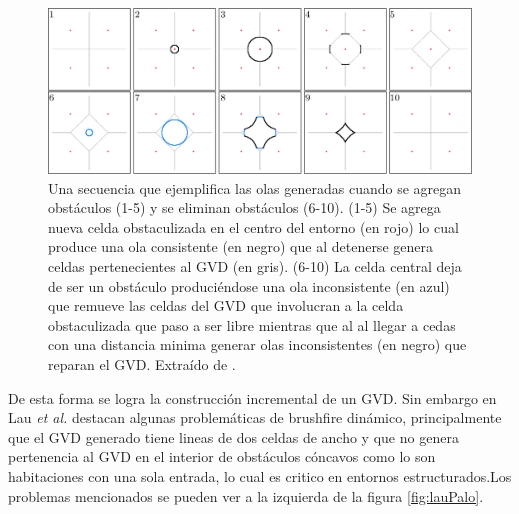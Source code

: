 \begin{figure}[H]
  \center
  \includegraphics[width=1\linewidth]{imagenes/wavesKalra.png}
  \caption{Una secuencia que ejemplifica las olas generadas cuando se agregan obstáculos (1-5) y se eliminan obstáculos (6-10). (1-5) Se agrega nueva celda obstaculizada en el centro del entorno (en rojo) lo cual produce una ola consistente (en negro) que al detenerse genera celdas pertenecientes al GVD (en gris). (6-10) La celda central deja de ser un obstáculo produciéndose una ola inconsistente (en azul) que remueve las celdas del GVD que involucran a la celda obstaculizada que paso a ser libre mientras que al al llegar a cedas con una distancia minima generar olas inconsistentes (en negro) que reparan el GVD. Extraído de \cite{kalra2009incremental}.}\label{fig:ejWavesIncKarlra}
\end{figure} 


De esta forma se logra la construcción incremental de un GVD. Sin embargo en \cite{Lau2013} Lau \textit{et al.} destacan algunas problemáticas de brushfire dinámico, principalmente que el GVD generado tiene lineas de dos celdas de ancho y que no genera pertenencia al GVD en el interior de obstáculos cóncavos como lo son habitaciones con una sola entrada, lo cual es critico en entornos estructurados.Los problemas mencionados se pueden ver a la izquierda de la figura \ref{fig:lauPalo}.

